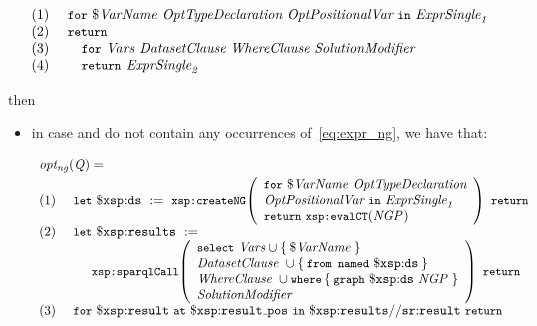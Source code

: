 \begin{queryF}
\[\begin{array}{l}
  \mathrm{(1)~~~~}\texttt{{\small for}}~\$\mathit{VarName}~{\textit{OptTypeDeclaration}}~{\textit{OptPositionalVar}}~\texttt{{\small in}}~\mathit{{{\textit{Expr\-Single}}}_{1}}\\
  \mathrm{(2)~~~~}\texttt{{\small return}} \\
  \mathrm{(3)~~~~}\quad\texttt{{\small for}}~\mathit{Vars}~{\textit{Da\-ta\-set\-Clau\-se}}~{\textit{Whe\-re\-Clause}}~{\textit{Solution\-Modifier}}\\
  \mathrm{(4)~~~~}\quad\texttt{{\small return}}~\mathit{{{\textit{Expr\-Single}}}_{2}}
  \end{array}\]
\label{eq:expr_ng}
\end{queryF}%
%
then
%
\begin{itemize}
\item in case  and  do not contain any occurrences of~\eqref{eq:expr_ng},
    we have that:
%
\begin{small}
\begin{equation*}
\begin{array}{l}
  \ong{\envElem{Q}{}} =\\[.3em]
    \mathrm{(1)~~~~}\LET~\varR{ds}~:=~\funcCallR{createNG}{\begin{array}{l}
                      \FOR~\var{VarName}~\grammarRule{OptTypeDeclaration}\\
                      \grammarRule{OptPositionalVar}~\IN~\envElem{\ExprSingle}{1} \\
                      \RETURN~\funcCallR{evalCT}{ \envElem{NGP}{}}\\
                    \end{array}}~\RETURN\\
    \mathrm{(2)~~~~}\LET~\varR{results}~:= \\
    \qquad\qquad\funcCallR{sparqlCall}{
                    \begin{array}{l}
                      \SELECT~\Vars \cup \set{\var{VarName}} \\
                      \DatasetClause~\cup \set{ \FROMNAMED~\varR{ds} }\\
                      \SparqlWhereClause~\cup \WHERE\set{ \keyword{graph}~\varR{ds}~\envElem{NGP}{} } \\
                      \SolutionModifier
                    \end{array}}~\RETURN\\
    \mathrm{(3)~~~~} \FOR~\varR{result}~\AT~\varR{result\mathunderscore{}pos}~\IN~\varR{results//sr{:}result}~\RETURN \\

\end{array}
\end{equation*}
\end{small}
\end{itemize}

